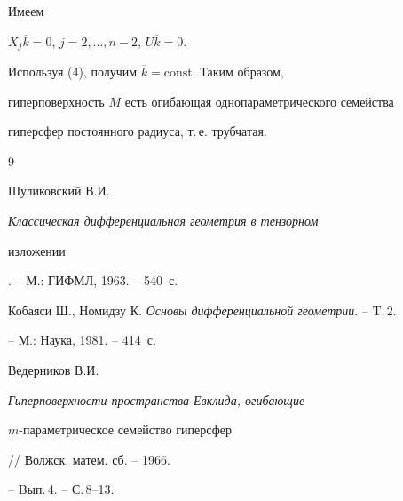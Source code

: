 Имеем


$X_j\overline{k}=0$, $j=2,\dotsc,n-2$, $U\overline{k}=0$.


Используя (4), получим $\overline{k}=\text{const}$. Таким образом,


гиперповерхность $M$ есть огибающая однопараметрического семейства


гиперсфер постоянного радиуса, т.\,е. трубчатая.








\begin{thebibliography}{9}




Шуликовский В.И. {\em Классическая дифференциальная геометрия в тензорном


изложении}. -- М.: ГИФМЛ, 1963. -- 540~с.




Кобаяси Ш., Номидзу К. {\em Основы дифференциальной геометрии}. -- T.\,2.


-- М.: Наука, 1981. -- 414~с.




Ведерников В.И. {\em Гиперповерхности пространства Евклида, огибающие


$m$-параметрическое семейство гиперсфер} // Волжск. матем. сб. -- 1966.


-- Bып.\,4. -- С.\,8--13.





\end{thebibliography}





\vskip 2cm












\label{end}





